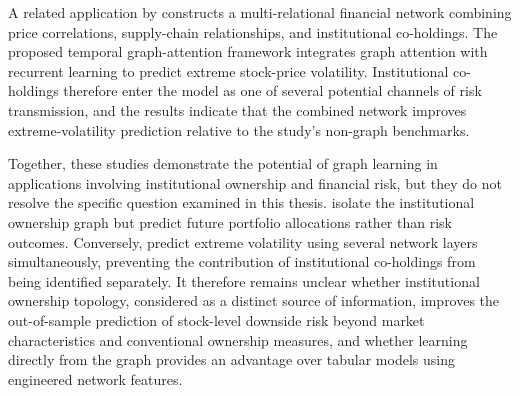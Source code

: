 A related application by \textcite{tagndynamic2026} constructs a multi-relational financial network combining price correlations, supply-chain relationships, and institutional co-holdings. The proposed temporal graph-attention framework integrates graph attention with recurrent learning to predict extreme stock-price volatility. Institutional co-holdings therefore enter the model as one of several potential channels of risk transmission, and the results indicate that the combined network improves extreme-volatility prediction relative to the study's non-graph benchmarks.

Together, these studies demonstrate the potential of graph learning in applications involving institutional ownership and financial risk, but they do not resolve the specific question examined in this thesis. \textcite{izadifar2026institutional} isolate the institutional ownership graph but predict future portfolio allocations rather than risk outcomes. Conversely, \textcite{tagndynamic2026} predict extreme volatility using several network layers simultaneously, preventing the contribution of institutional co-holdings from being identified separately. It therefore remains unclear whether institutional ownership topology, considered as a distinct source of information, improves the out-of-sample prediction of stock-level downside risk beyond market characteristics and conventional ownership measures, and whether learning directly from the graph provides an advantage over tabular models using engineered network features.
